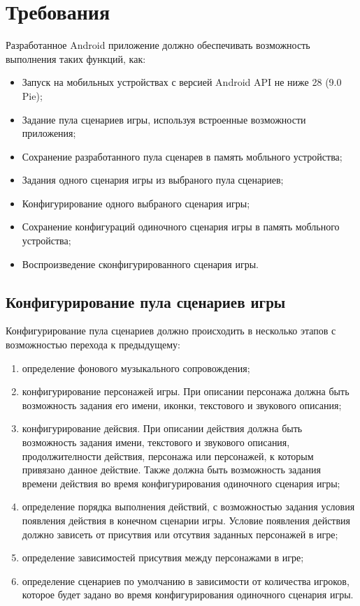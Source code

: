 \section{Требования}

Разработанное Android приложение должно обеспечивать возможность выполнения таких функций, как:

\begin{itemize}
    \item Запуск на мобильных устройствах с версией Android API не ниже 28 (9.0 Pie);
    \item Задание пула сценариев игры, используя встроенные возможности приложения;
    \item Сохранение разработанного пула сценарев в память мобльного устройства;
    \item Задания одного сценария игры из выбраного пула сценариев;
    \item Конфигурирование одного выбраного сценария игры;
    \item Сохранение конфигураций одиночного сценария игры в память мобльного устройства;
    \item Воспроизведение сконфигурированного сценария игры.
\end{itemize}

\subsection{Конфигурирование пула сценариев игры}

Конфигурирование пула сценариев должно происходить в несколько этапов с возможностью перехода к предыдущему: 

\begin{enumerate}
    \item определение фонового музыкального сопровождения;
    \item конфигурирование персонажей игры. При описании персонажа должна быть возможность задания его имени, иконки, текстового и звукового описания;
    \item конфигурирование дейсвия. При описании действия должна быть возможность задания имени, текстового и звукового описания, продолжителности действия, персонажа или персонажей, к которым привязано данное действие. Также должна быть возможность задания времени действия во время конфигурирования одиночного сценария игры;
    \item определение порядка выполнения действий, с возможностью задания условия появления действия в конечном сценарии игры. Условие появления действия должно зависеть от присутвия или отсутвия заданных персонажей в игре;
    \item определение зависимостей присутвия между персонажами в игре;
    \item определение сценариев по умолчанию в зависимости от количества игроков, которое будет задано во время конфигурирования одиночного сценария игры.
\end{enumerate}

